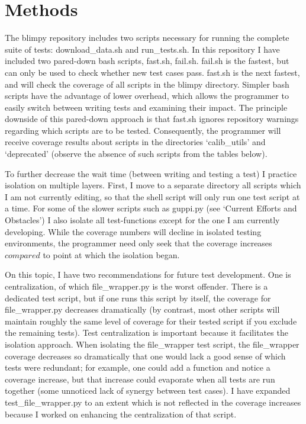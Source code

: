 \documentclass[12pt]{article}
\begin{document}
\section{Methods}

\quad \quad The blimpy repository includes two scripts necessary for running the complete suite of tests: download\_data.sh and run\_tests.sh. In this repository I have included two pared-down bash scripts, fast.sh, fail.sh. fail.sh is the fastest, but can only be used to check whether new test cases pass. fast.sh is the next fastest, and will check the coverage of all scripts in the blimpy directory. Simpler bash scripts have the advantage of lower overhead, which allows the programmer to easily switch between writing tests and examining their impact. The principle downside of this pared-down approach is that fast.sh ignores repository warnings regarding which scripts are to be tested. Consequently, the programmer will receive coverage results about scripts in the directories `calib\_utils' and `deprecated' (observe the absence of such scripts from the tables below).

To further decrease the wait time (between writing and testing a test) I practice isolation on multiple layers. First, I move to a separate directory all scripts which I am not currently editing, so that the shell script will only run one test script at a time. For some of the slower scripts such as guppi.py (see `Current Efforts and Obstacles') I also isolate all test-functions except for the one I am currently developing. While the coverage numbers will decline in isolated testing environments, the programmer need only seek that the coverage increases $compared$ to point at which the isolation began.

On this topic, I have two recommendations for future test development. One is centralization, of which file\_wrapper.py is the worst offender. There is a dedicated test script, but if one runs this script by itself, the coverage for file\_wrapper.py decreases dramatically (by contrast, most other scripts will maintain roughly the same level of coverage for their tested script if you exclude the remaining tests). Test centralization is important because it facilitates the isolation approach. When isolating the file\_wrapper test script, the file\_wrapper coverage decreases so dramatically that one would lack a good sense of which tests were redundant; for example, one could add a function and notice a coverage increase, but that increase could evaporate when all tests are run together (some unnoticed lack of synergy between test cases). I have expanded test\_file\_wrapper.py to an extent which is not reflected in the coverage increases because I worked on enhancing the centralization of that script.
\end{document}
